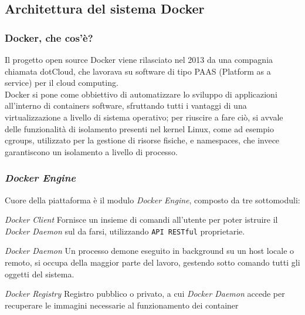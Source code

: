 \documentclass{beamer}
\begin{document}

\subsection{Architettura del sistema Docker} %

\begin{frame}
\frametitle{Docker, che cos'è?}
Il progetto open source Docker viene rilasciato nel 2013 da una compagnia chiamata dotCloud, che lavorava su software di tipo PAAS (Platform as a service) per il cloud computing.\\
Docker si pone come obbiettivo di automatizzare lo sviluppo di applicazioni all’interno di containers software, sfruttando tutti i vantaggi di una virtualizzazione a livello di sistema operativo; per riuscire a fare ciò, si avvale delle funzionalità di isolamento presenti nel kernel Linux, come ad esempio cgroups, utilizzato per la gestione di risorse fisiche, e namespaces, che invece garantiscono un isolamento a livello di processo.
\end{frame}


\begin{frame}
\frametitle{ \textit{Docker Engine}}
Cuore della piattaforma è il modulo \textit{Docker Engine}, composto da tre sottomoduli:
\begin{block}{ \textit{Docker Client}}
Fornisce un insieme di comandi all’utente per poter istruire il  \textit{Docker Daemon} sul da farsi, utilizzando \texttt{API RESTful} proprietarie.
\end{block}

\begin{block}{\textit{Docker Daemon}}
Un processo demone eseguito in background su un host locale o remoto, si occupa della maggior parte del lavoro, gestendo sotto comando tutti gli oggetti del sistema.
\end{block}

\begin{block}{\textit{Docker Registry}}
Registro pubblico o privato, a cui \textit{Docker Daemon} accede per recuperare le immagini necessarie al funzionamento dei container
\end{block}
\end{frame}

\end{document}
